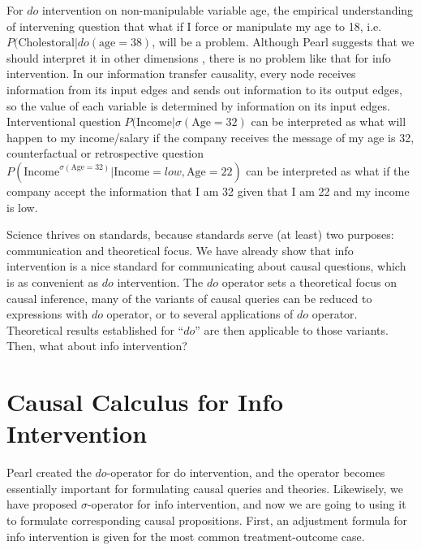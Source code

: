 For $do$ intervention on non-manipulable variable age, the empirical understanding of intervening question that what if I force or manipulate my age to 18,  i.e. $P(\mathrm{Cholestoral}|do(\mathrm{age}=38)$, will be a problem. Although Pearl suggests that we should interpret it in other dimensions \cite{Pearl2019do}, there is no problem like that for info intervention. In our information transfer causality, every node receives information from its input edges and sends out information to its output edges, so the value of each variable is determined by information on its input edges. Interventional question $P(\mathrm{Income}| \sigma(\mathrm{Age}=32)$ can be interpreted as  what will happen to my income/salary if the company receives the message of my age is 32, counterfactual or retrospective question $P(\mathrm{Income}^{\sigma(\mathrm{Age}=32)} | \mathrm{Income}=low, \mathrm{Age}=22)$  can be interpreted as what if the company accept the information that I am 32 given that I am 22 and my income is low.




Science thrives on standards, because standards serve (at least) two purposes: communication and theoretical focus. We have already show that info intervention is a nice standard for communicating about causal questions, {{which is as convenient as $do$ intervention}}. The $do$ operator sets a theoretical focus on causal inference, many of the variants of causal queries can be reduced to expressions with $do$ operator, or to several applications of $do$ operator. Theoretical results established for “$do$” are then applicable to those variants. Then, what about info intervention?

\section{Causal Calculus for Info Intervention}

Pearl created the $do$-operator for do intervention, and the operator becomes essentially important for formulating causal queries and theories. Likewisely, we have proposed $\sigma$-operator for info intervention, and now we are going to using it to formulate corresponding causal propositions.  First, an adjustment formula for info intervention is given for the most common treatment-outcome case. 
 
